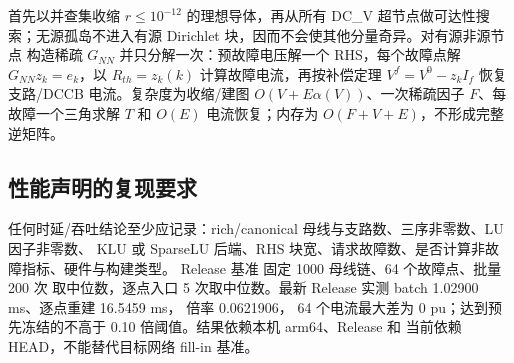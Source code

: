  首先以并查集收缩 $r\le10^{-12}$ 的理想导体，再从所有 DC\_V
超节点做可达性搜索；无源孤岛不进入有源 Dirichlet 块，因而不会使其他分量奇异。对有源非源节点
构造稀疏 $G_{NN}$ 并只分解一次：预故障电压解一个 RHS，每个故障点解 $G_{NN}z_k=e_k$，以
$R_{th}=z_k(k)$ 计算故障电流，再按补偿定理
$V^f=V^0-z_k I_f$ 恢复支路/DCCB 电流。复杂度为收缩/建图 $O(V+E\alpha(V))$、一次稀疏因子
$F$、每故障一个三角求解 $T$ 和 $O(E)$ 电流恢复；内存为 $O(F+V+E)$，不形成完整逆矩阵。

\subsection{性能声明的复现要求}

任何时延/吞吐结论至少应记录：rich/canonical 母线与支路数、三序非零数、LU 因子非零数、
KLU 或 SparseLU 后端、RHS 块宽、请求故障数、是否计算非故障指标、硬件与构建类型。
Release 基准  固定 1000 母线链、64 个故障点、批量 200 次
取中位数，逐点入口 5 次取中位数。最新 Release 实测 batch 1.02900 ms、逐点重建 16.5459 ms，
倍率 0.0621906，
64 个电流最大差为 0 pu；达到预先冻结的不高于 0.10 倍阈值。结果依赖本机 arm64、Release 和
当前依赖 HEAD，不能替代目标网络 fill-in 基准。
